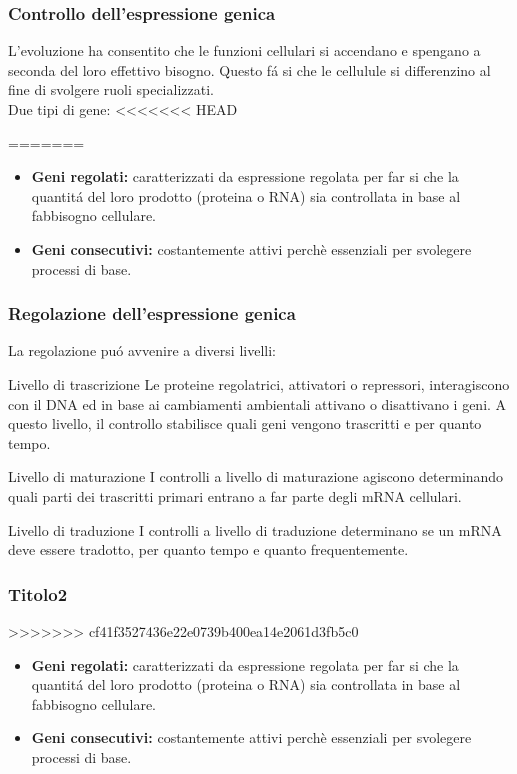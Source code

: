 \documentclass[hyperref={pdfpagelabels=false}]{beamer}
\begin{document}
\begin{frame}\frametitle{Controllo dell'espressione genica}
L'evoluzione ha consentito che le funzioni cellulari si accendano e spengano a seconda del loro effettivo bisogno. Questo f\'a si che le cellulule si differenzino al fine di svolgere ruoli specializzati.
\\
Due tipi di gene:
<<<<<<< HEAD

=======
\begin{itemize}
\item \textbf{Geni regolati:}  caratterizzati da espressione regolata per far si che la quantit\'a del loro prodotto (proteina o RNA) sia controllata in base al fabbisogno cellulare.
\item \textbf{Geni consecutivi:} costantemente attivi perchè essenziali per svolegere processi di base.
\end{itemize}
\end{frame}
\begin{frame}\frametitle{Regolazione dell'espressione genica}
La regolazione pu\'o avvenire a diversi livelli:
\begin{block}{Livello di trascrizione}
Le proteine regolatrici, attivatori o repressori, interagiscono con il DNA ed in base ai cambiamenti ambientali attivano o disattivano i geni. A questo livello, il controllo stabilisce quali geni vengono trascritti e per quanto tempo.
\end{block}
\begin{block}{Livello di maturazione}
I controlli a livello di maturazione agiscono determinando quali parti dei trascritti primari entrano a far parte degli mRNA cellulari.
\end{block}
\begin{block}{Livello di traduzione}
I controlli a livello di traduzione determinano se un mRNA deve essere tradotto, per quanto tempo e quanto frequentemente.
\end{block}
\end{frame}

\begin{frame}\frametitle{Titolo2}
>>>>>>> cf41f3527436e22e0739b400ea14e2061d3fb5c0
\begin{itemize}
\item \textbf{Geni regolati:}  caratterizzati da espressione regolata per far si che la quantit\'a del loro prodotto (proteina o RNA) sia controllata in base al fabbisogno cellulare.
\item \textbf{Geni consecutivi:} costantemente attivi perchè essenziali per svolegere processi di base.
\end{itemize}
\end{frame}
\end{document}
